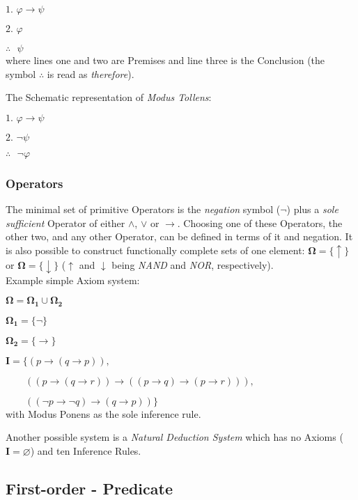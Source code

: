 \documentclass{article}
\begin{document}
$\textrm{1. }\varphi \rightarrow \psi$

$\textrm{2. }\varphi$

$\therefore\textrm{ }\psi$
\\
where lines one and two are Premises and line three is the Conclusion
(the symbol $\therefore$ is read as \emph{therefore}).

The Schematic representation of \emph{Modus Tollens}:

$\textrm{1. }\varphi \rightarrow \psi$

$\textrm{2. }\neg\psi$

$\therefore\textrm{ }\neg\varphi$

\subsubsection{Operators}

The minimal set of primitive Operators is the \emph{negation} symbol
($\neg$) plus a \emph{sole sufficient} Operator of either $\land$,
$\lor$ or $\rightarrow$. Choosing one of these Operators, the other
two, and any other Operator, can be defined in terms of it and
negation. It is also possible to construct functionally complete sets
of one element: $\mathbf{\Omega} = \{\uparrow\}$ or $\mathbf{\Omega} =
\{\downarrow\}$ ($\uparrow$ and $\downarrow$ being \emph{NAND} and
\emph{NOR}, respectively).
\\
Example simple Axiom system:

$\mathbf{\Omega} = \mathbf{\Omega_1} \cup \mathbf{\Omega_2}$

$\mathbf{\Omega_1} = \{\neg\}$

$\mathbf{\Omega_2} = \{\rightarrow\}$

$\mathbf{I} = \{ (p \rightarrow (q \rightarrow p)),$

$\qquad((p \rightarrow (q \rightarrow r)) \rightarrow
(( p \rightarrow q) \rightarrow (p \rightarrow r))),$

$\qquad(( \neg p \rightarrow \neg q ) \rightarrow (q \rightarrow p )) \}$\\
with Modus Ponens as the sole inference rule.

Another possible system is a \emph{Natural Deduction
  System}\cite{jaskowski34} which has no Axioms
($\mathbf{I}=\varnothing$) and ten Inference Rules.

\subsection{First-order - Predicate}
\end{document}
